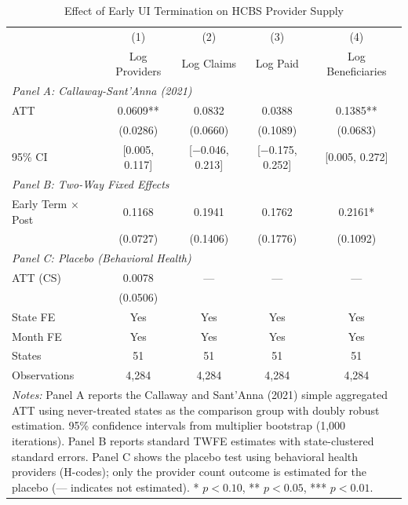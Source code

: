 \begin{table}[htbp]
\centering
\caption{Effect of Early UI Termination on HCBS Provider Supply}
\label{tab:main_results}
\begin{tabular}{lcccc}
\hline\hline
 & (1) & (2) & (3) & (4) \\
 & Log Providers & Log Claims & Log Paid & Log Beneficiaries \\
\hline
\multicolumn{5}{l}{\textit{Panel A: Callaway-Sant'Anna (2021)}} \\
ATT & 0.0609** & 0.0832 & 0.0388 & 0.1385** \\
 & (0.0286) & (0.0660) & (0.1089) & (0.0683) \\
95\% CI & [0.005, 0.117] & [$-$0.046, 0.213] & [$-$0.175, 0.252] & [0.005, 0.272] \\
[6pt]
\multicolumn{5}{l}{\textit{Panel B: Two-Way Fixed Effects}} \\
Early Term $\times$ Post & 0.1168 & 0.1941 & 0.1762 & 0.2161* \\
 & (0.0727) & (0.1406) & (0.1776) & (0.1092) \\
[6pt]
\multicolumn{5}{l}{\textit{Panel C: Placebo (Behavioral Health)}} \\
ATT (CS) & 0.0078 & --- & --- & --- \\
 & (0.0506) & & & \\
\hline
State FE & Yes & Yes & Yes & Yes \\
Month FE & Yes & Yes & Yes & Yes \\
States & 51 & 51 & 51 & 51 \\
Observations & 4,284 & 4,284 & 4,284 & 4,284 \\
\hline\hline
\multicolumn{5}{p{13cm}}{\footnotesize \textit{Notes:} Panel A reports the Callaway and Sant'Anna (2021) simple aggregated ATT using never-treated states as the comparison group with doubly robust estimation. 95\% confidence intervals from multiplier bootstrap (1,000 iterations). Panel B reports standard TWFE estimates with state-clustered standard errors. Panel C shows the placebo test using behavioral health providers (H-codes); only the provider count outcome is estimated for the placebo (--- indicates not estimated). * $p<0.10$, ** $p<0.05$, *** $p<0.01$.} \\
\end{tabular}
\end{table}

